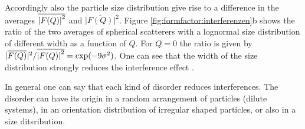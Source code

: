 Accordingly also the particle size distribution give rise to a difference
in the averages {\small $\overline{\abs{F(Q)}^2}$} and {\small $\vert{\overline{F(Q)}}\vert^2$}.
Figure \ref{fig:formfactor:interferenzen}b shows the ratio of the two averages
of spherical scatterers with a lognormal size distribution of different width as a
function of $Q$.  For $Q=0$ the ratio is given by
{\small $\vert{\overline{F(Q)}}\vert^2/\overline{\abs{F(Q)}^2} = \exp(-9\sigma^2)$}.
One can see that the width of the size distribution strongly reduces the interference effect
\cite{scatt151}.

In general one can say that each kind of disorder reduces interferences.
The disorder can have its origin in a random arrangement of particles
(dilute systems), in an orientation distribution of irregular shaped particles,
or also in a size ditsribution.
